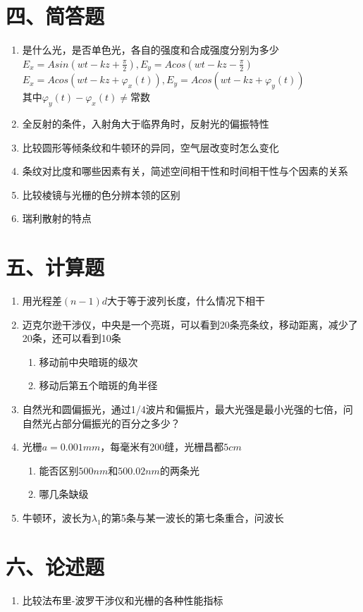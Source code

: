 \documentclass[12pt, a4paper]{article}
\theoremstyle{solution}
\begin{document}
\section*{四、简答题}
\begin{enumerate}
    \item 是什么光，是否单色光，各自的强度和合成强度分别为多少\\
    $E_x=Asin(wt-kz+\frac{\pi}{2}),E_y=Acos(wt-kz-\frac{\pi}{2})$\\
    $E_x=Acos(wt-kz+\varphi _x(t)),E_y=Acos(wt-kz+\varphi_y(t))$\\
    其中$\varphi _y(t)-\varphi _x(t)\neq 常数$
    \item 全反射的条件，入射角大于临界角时，反射光的偏振特性
    \item 比较圆形等倾条纹和牛顿环的异同，空气层改变时怎么变化
    \item 条纹对比度和哪些因素有关，简述空间相干性和时间相干性与个因素的关系
    \item 比较棱镜与光栅的色分辨本领的区别
    \item 瑞利散射的特点
\end{enumerate}
\section*{五、计算题}
\begin{enumerate}
    \item 用光程差$(n-1)d $大于等于波列长度，什么情况下相干
    \item 迈克尔逊干涉仪，中央是一个亮斑，可以看到20条亮条纹，移动距离，减少了20条，还可以看到10条
        \begin{enumerate}
            \item 移动前中央暗斑的级次
            \item 移动后第五个暗斑的角半径
        \end{enumerate}
    \item 自然光和圆偏振光，通过1/4波片和偏振片，最大光强是最小光强的七倍，问自然光占部分偏振光的百分之多少？
    \item 光栅$a=0.001mm$，每毫米有200缝，光栅昌都$5cm$
        \begin{enumerate}
            \item 能否区别$500nm$和$500.02nm$的两条光
            \item 哪几条缺级
        \end{enumerate}
    \item 牛顿环，波长为$\lambda_1$的第5条与某一波长的第七条重合，问波长
\end{enumerate}
\section*{六、论述题}
\begin{enumerate}
    \item 比较法布里-波罗干涉仪和光栅的各种性能指标
\end{enumerate}
\end{document}
